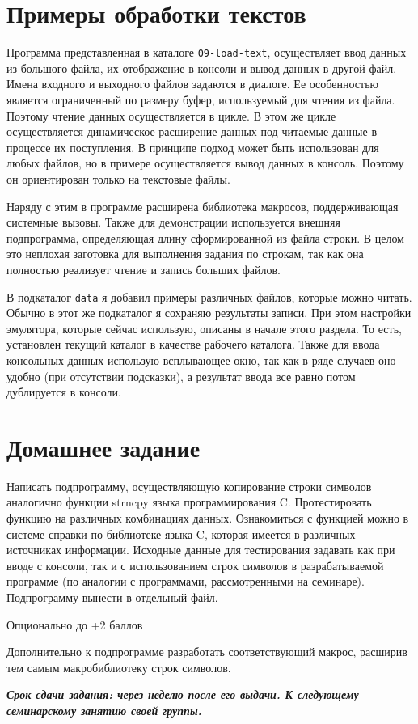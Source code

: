 
\section{Примеры обработки текстов}

Программа представленная в каталоге \verb|09-load-text|, осуществляет ввод данных из большого файла, их отображение в консоли и вывод данных в другой файл. Имена входного и выходного файлов задаются в диалоге. Ее особенностью является ограниченный по размеру буфер, используемый для чтения из файла. Поэтому чтение данных осуществляется в цикле. В этом же цикле осуществляется динамическое расширение данных под читаемые данные в процессе их поступления. В принципе подход может быть использован для любых файлов, но в примере осуществляется вывод данных в консоль. Поэтому он ориентирован только на текстовые файлы.

Наряду с этим в программе расширена библиотека макросов, поддерживающая системные вызовы. Также для демонстрации используется внешняя подпрограмма, определяющая длину сформированной из файла строки. В целом это неплохая заготовка для выполнения задания по строкам, так как она полностью реализует чтение и запись больших файлов.

В подкаталог \verb|data| я добавил примеры различных файлов, которые можно читать. Обычно в этот же подкаталог я сохраняю результаты записи. При этом настройки эмулятора, которые сейчас использую, описаны в начале этого раздела. То есть, установлен текущий каталог в качестве рабочего каталога. Также для ввода консольных данных использую всплывающее окно, так как в ряде случаев оно удобно (при отсутствии подсказки), а результат ввода все равно потом дублируется в консоли.

\section{Домашнее задание}


Написать подпрограмму, осуществляющую копирование строки символов аналогично функции strncpy языка программирования C. Протестировать функцию на различных комбинациях данных. Ознакомиться с функцией можно в системе справки по библиотеке языка C, которая имеется в различных источниках информации. Исходные данные для тестирования задавать как при вводе с консоли, так и с использованием строк символов в разрабатываемой программе (по аналогии с программами, рассмотренными на семинаре). Подпрограмму вынести в отдельный файл.

Опционально до +2 баллов

Дополнительно к подпрограмме разработать соответствующий макрос, расширив тем самым макробиблиотеку строк символов.


\textbf{\textit{Срок сдачи задания: через неделю после его выдачи. К следующему семинарскому занятию своей группы.}}
